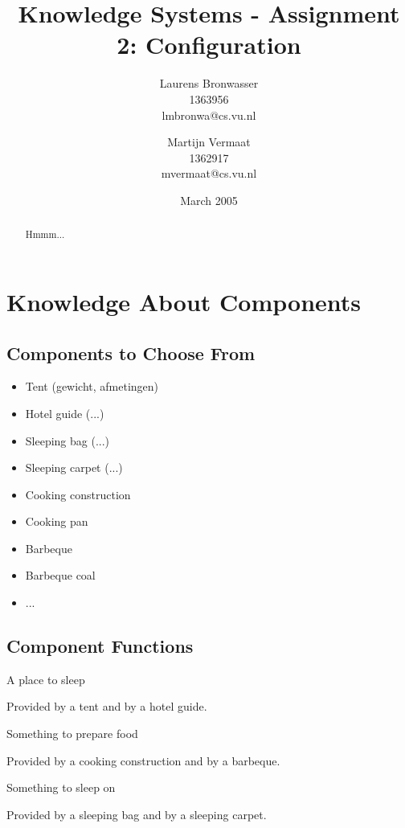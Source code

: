 \documentclass[a4paper,11pt]{article}
\title{Knowledge Systems - Assignment 2: Configuration}
\author{Laurens Bronwasser\\
1363956\\
lmbronwa@cs.vu.nl
\and
Martijn Vermaat\\
1362917\\
mvermaat@cs.vu.nl}
\date{March 2005}
\begin{document}
\maketitle


\renewcommand{\abstractname}{Introduction} %
\begin{abstract}
  Hmmm...
\end{abstract}


\section*{Knowledge About Components}


\subsection*{Components to Choose From}

\begin{itemize}
\item Tent (gewicht, afmetingen)
\item Hotel guide (...)
\item Sleeping bag (...)
\item Sleeping carpet (...)
\item Cooking construction
\item Cooking pan
\item Barbeque
\item Barbeque coal
\item ...
\end{itemize}


\subsection*{Component Functions}

\begin{description}

\item{A place to sleep}

Provided by a tent and by a hotel guide.

\item{Something to prepare food}

Provided by a cooking construction and by a barbeque.

\item{Something to sleep on}

Provided by a sleeping bag and by a sleeping carpet.

\end{description}
\end{document}
